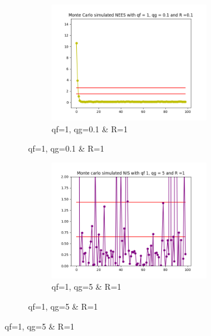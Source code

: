 \documentclass{article}
\begin{document}
\begin{figure}[H]
\begin{subfigure}{1\textwidth}
                \begin{subfigure}{.3\textwidth}  
                    \includegraphics[width=1\linewidth]{./img/mc/acc/nees1_qg01_r01.png}
                    \caption{qf=1, qg=0.1 \& R=1 }
                \end{subfigure}
            \end{subfigure}
            \begin{subfigure} {1\textwidth}    
                \begin{subfigure}{.3\textwidth}  
                    \includegraphics[width=1\linewidth]{./img/mc/acc/nis1_qg5_r1.png}
                    \caption{qf=1, qg=5 \& R=1}
                \end{subfigure}

\end{subfigure}
\end{figure}
\end{document}

